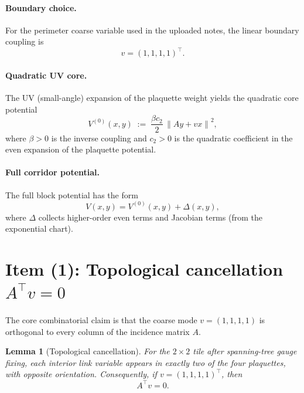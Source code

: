 \documentclass[11pt]{article}
\newtheorem{lemma}[theorem]{Lemma}
\theoremstyle{definition}
\newcommand{\1}{\mathbf{1}}
\newcommand{\norm}[1]{\left\lVert#1\right\rVert}
\begin{document}
\paragraph{Boundary choice.}
For the perimeter coarse variable used in the uploaded notes, the linear boundary coupling is
\begin{equation}\label{eq:v-def}
 v=(1,1,1,1)^\top.
\end{equation}

\paragraph{Quadratic UV core.}
The UV (small-angle) expansion of the plaquette weight yields the quadratic core potential
\begin{equation}\label{eq:V0}
V^{(0)}(x,y) \;:=\; \frac{\beta c_2}{2}\,\norm{Ay+vx}^2,
\end{equation}
where $\beta>0$ is the inverse coupling and $c_2>0$ is the quadratic coefficient in the even expansion of the plaquette potential.

\paragraph{Full corridor potential.}
The full block potential has the form
\begin{equation}\label{eq:Vfull}
V(x,y)=V^{(0)}(x,y)+\Delta(x,y),
\end{equation}
where $\Delta$ collects higher-order even terms and Jacobian terms (from the exponential chart).

\section{Item (1): Topological cancellation $A^\top v=0$}

The core combinatorial claim is that the coarse mode $v=(1,1,1,1)$ is orthogonal to every column of the incidence matrix $A$.

\begin{lemma}[Topological cancellation]\label{lem:Atv0}
For the $2\times2$ tile after spanning-tree gauge fixing, each interior link variable appears in exactly two of the four plaquettes, with opposite orientation. Consequently, if $v=(1,1,1,1)^\top$, then
\[
A^\top v=0.
\]
\end{lemma}
\end{document}
